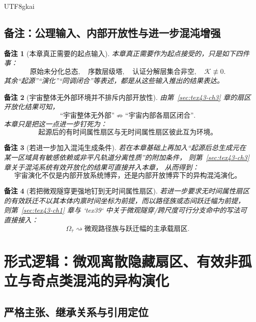 \documentclass[12pt]{article}
\newtheorem{remark}{备注}[section]
\begin{document}
\begin{CJK*}{UTF8}{gkai}
\subsection{备注：公理输入、内部开放性与进一步混沌增强}
\label{subsec:tex43-ch4-remarks}

\begin{remark}[本章真正需要的起点输入]
本章真正需要作为起点接受的，只是如下四件事：
\[
  \text{原始未分化总态},
  \quad
  \text{序数层级塔},
  \quad
  \text{认证分解层集合非空},
  \quad
  \mathcal K\not\equiv 0.
\]
其余“起源”“演化”“同调闭合”等表述，都是从这些输入推出的结果表达。
\end{remark}

\begin{remark}[宇宙整体无外部环境并不排斥内部开放性]
由第~\ref{sec:tex43-ch3} 章的扇区开放化结果可知，
\[
  \text{“宇宙整体无外部”}
  \not\Rightarrow
  \text{“宇宙内部各扇区闭合”}.
\]
本章只是把这一点进一步钉死为：
\[
  \text{起源后的有时间属性扇区与无时间属性扇区彼此互为环境。}
\]
\end{remark}

\begin{remark}[若进一步加入混沌生成条件]
若在本章基础上再加入“起源后总生成元在某一区域具有敏感依赖或非平凡轨道分离性质”的附加条件，
则第~\ref{sec:tex43-ch3} 章关于混沌系统有效开放化的结果可直接并入本章，
从而得到：
\[
  \text{宇宙演化不仅是内部开放系统博弈，还是内部开放博弈下的异构混沌演化。}
\]
\end{remark}

\begin{remark}[若把微观隧穿更强地钉到无时间属性扇区]
若进一步要求无时间属性扇区的有效跃迁不以其本体内禀时间坐标为前提，而以路径族或态间跃迁幅为前提，
则第~\ref{sec:tex43-ch1} 章与 `tex39` 中关于微观隧穿/跨尺度可行分支命中的写法可直接接入：
\[
  \Omega_{\bar\tau}
  \rightsquigarrow
  \text{微观路径族与跃迁幅的主承载扇区}.
\]
\end{remark}

\clearpage

\section{形式逻辑：微观离散隐藏扇区、有效非孤立与奇点类混沌的异构演化}
\label{sec:tex43-ch5}

\subsection{严格主张、继承关系与引用定位}
\label{subsec:tex43-ch5-convention}


\end{CJK*}
\end{document}
